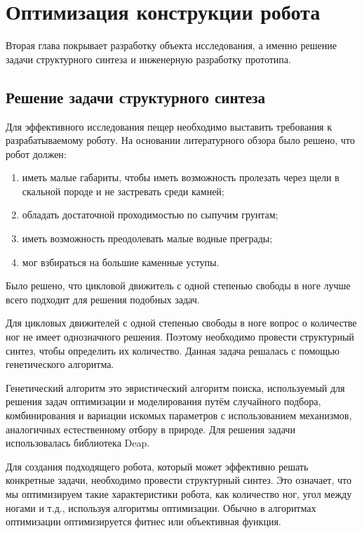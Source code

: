 
\chapter{Оптимизация конструкции робота}\label{ch:ch2}

Вторая глава покрывает разработку объекта исследования, а именно решение задачи структурного синтеза и инженерную разработку прототипа.

\section{Решение задачи структурного синтеза}

Для эффективного исследования пещер необходимо выставить требования к разрабатываемому роботу. На основании литературного обзора было решено, что робот должен:
\begin{enumerate}
    \item иметь малые габариты, чтобы иметь возможность пролезать через щели в скальной породе и не застревать среди камней;
    \item обладать достаточной проходимостью по сыпучим грунтам;
    \item иметь возможность преодолевать малые водные преграды;
    \item мог взбираться на большие каменные уступы.
\end{enumerate}

Было решено, что цикловой движитель с одной степенью свободы в ноге лучше всего подходит для решения подобных задач.

Для цикловых движителей с одной степенью свободы в ноге вопрос о количестве ног не имеет однозначного решения. Поэтому необходимо провести структурный синтез, чтобы определить их количество. Данная задача решалась с помощью генетического алгоритма.

Генетический алгоритм это эвристический алгоритм поиска, используемый для решения задач оптимизации и моделирования путём случайного подбора, комбинирования и вариации искомых параметров с использованием механизмов, аналогичных естественному отбору в природе. Для решения задачи использовалась библиотека Deap.

Для создания подходящего робота, который может эффективно решать конкретные задачи, необходимо провести структурный синтез. Это означает, что мы оптимизируем такие характеристики робота, как количество ног, угол между ногами и т.д., используя алгоритмы оптимизации. Обычно в алгоритмах оптимизации оптимизируется фитнес или объективная функция. 

